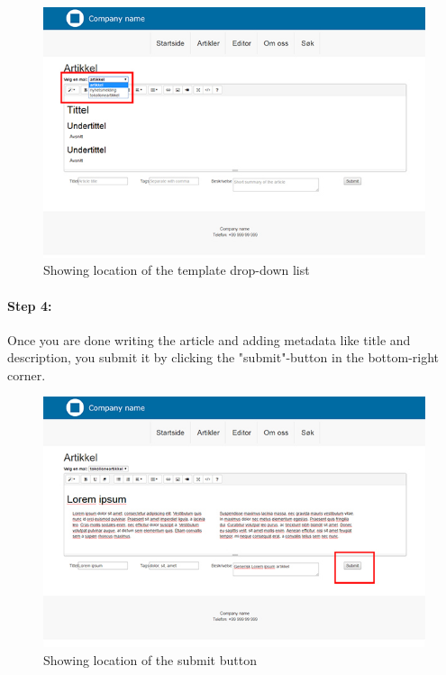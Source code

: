 \begin{figure}[H]
    \centering
    \includegraphics[scale=0.70]{fig/userManual/4}
    \caption{Showing location of the template drop-down list}
    \label{fig:manual4}
\end{figure}


\paragraph{Step 4:} Once you are done writing the article and adding metadata like title and description, you submit it by clicking the "submit"-button in the bottom-right corner. 
\begin{figure}[H]
    \centering
    \includegraphics[scale=0.70]{fig/userManual/5}
    \caption{Showing location of the submit button}
    \label{fig:manual5}
\end{figure}


